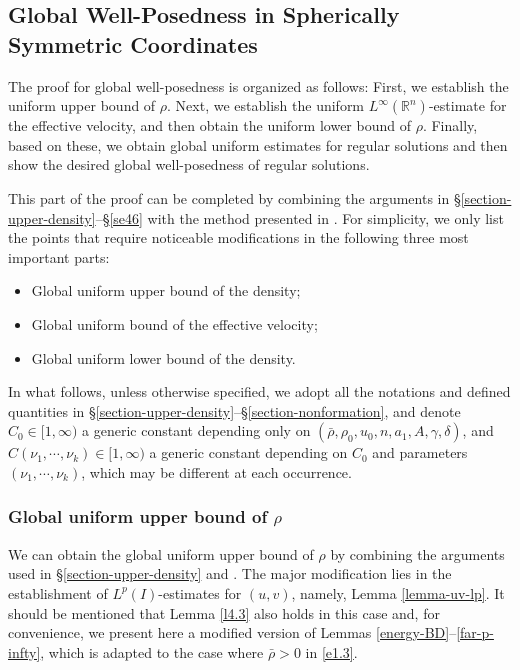 \documentclass[11pt,reqno]{amsart}
\numberwithin{rk}{section}
\numberwithin{prop}{section}
\numberwithin{mydef}{section}
\numberwithin{lem}{section}
\numberwithin{equation}{section}
\numberwithin{thm}{section}
\begin{document}
\smallskip
\subsection{Global Well-Posedness in  Spherically Symmetric  Coordinates}

The proof for global well-posedness is organized as follows: First, we establish the  uniform upper bound of $\rho$. Next, we establish the uniform $L^\infty(\mathbb{R}^n)$-estimate for the effective velocity, and then obtain the  uniform lower bound of $\rho$. Finally, based on these, we obtain global uniform estimates for regular solutions and then show the desired  global well-posedness of regular solutions.


This part of the proof can be completed by combining the arguments in \S\ref{section-upper-density}--\S\ref{se46} with the method presented in \cite[Section 10]{CZZ1}.  For simplicity, we only list the points that require noticeable modifications in the following three most important parts:
\begin{itemize}
\item[\S\ref{subsub1}] Global uniform upper bound of the density;
\item[\S\ref{subsub2}] Global uniform bound of the effective velocity;
\item[\S\ref{subsub3}] Global uniform lower bound of the density.
\end{itemize}

In what follows, unless otherwise specified, we adopt all the notations and defined quantities in \S\ref{section-upper-density}--\S\ref{section-nonformation}, and denote $C_0 \in[1, \infty)$ a generic constant depending only on $\left(\bar\rho,\rho_0, u_0, n, a_1, A, \gamma,\delta\right)$, and $C\left(\nu_1, \cdots\!, \nu_k\right) \in[1, \infty)$ a generic constant depending on $C_0$ and parameters $\left(\nu_1, \cdots\!, \nu_k\right)$, which may be different at each occurrence.

\subsubsection{Global uniform upper bound of $\rho$}\label{subsub1}
We can obtain the global uniform upper bound of $\rho$ by combining the arguments used in \S\ref{section-upper-density} and  \cite[Section 10]{CZZ1}.
The major modification lies in the establishment of $L^p(I)$-estimates for $(u,v)$, namely, Lemma \ref{lemma-uv-lp}. It should be mentioned that Lemma \ref{l4.3} also holds in this case and, for convenience, we present here a modified version of Lemmas \ref{energy-BD}--\ref{far-p-infty}, which is adapted to the case where $\bar\rho>0$ in \eqref{e1.3}.
\end{document}
